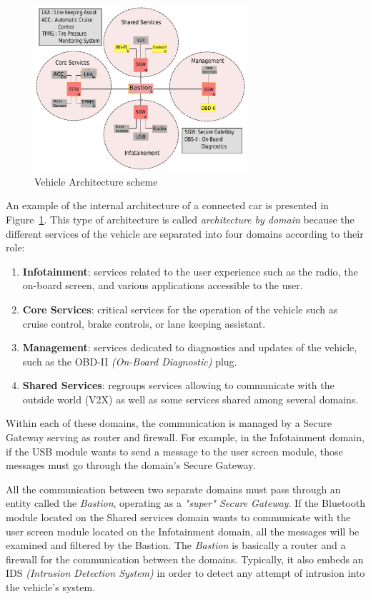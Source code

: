 \begin{figure}[h]
    \centering
    \includegraphics[width=0.7\textwidth]{schema/car_architeccture_compact.pdf}
    \caption{Vehicle Architecture scheme}
    \label{fig:game_archi}
\end{figure}

An example of the internal architecture of a connected car is presented in Figure~\ref{fig:game_archi}. This type of architecture is called \textit{architecture by domain} because the different services of the vehicle are separated into four domains according to their role:

\begin{enumerate}
    \item \textbf{Infotainment}: services related to the user experience such as the radio, the on-board screen, and various applications accessible to the user. 
    \item \textbf{Core Services}: critical services for the operation of the vehicle such as cruise control, brake controls, or lane keeping assistant.
    \item \textbf{Management}: services dedicated to diagnostics and updates of the vehicle, such as the OBD-II \textit{(On-Board Diagnostic)} plug. 
    \item \textbf{Shared Services}: regroups services allowing to communicate with the outside world (V2X) as well as some services shared among several domains.
\end{enumerate}

Within each of these domains, the communication is managed by a Secure Gateway serving as router and firewall. For example, in the Infotainment domain, if the USB module wants to send a message to the user screen module, those messages must go through the domain's Secure Gateway.

All the communication between two separate domains must pass through an entity called the \textit{Bastion}, operating as a \textit{"super" Secure Gateway}. If the Bluetooth module located on the Shared services domain wants to communicate with the user screen module located on the Infotainment domain, all the messages will be examined and filtered by the Bastion.
The \textit{Bastion} is basically a router and a firewall for the communication between the domains. Typically, it also embeds an IDS \textit{(Intrusion Detection System)} in order to detect any attempt of intrusion into the vehicle's system.

